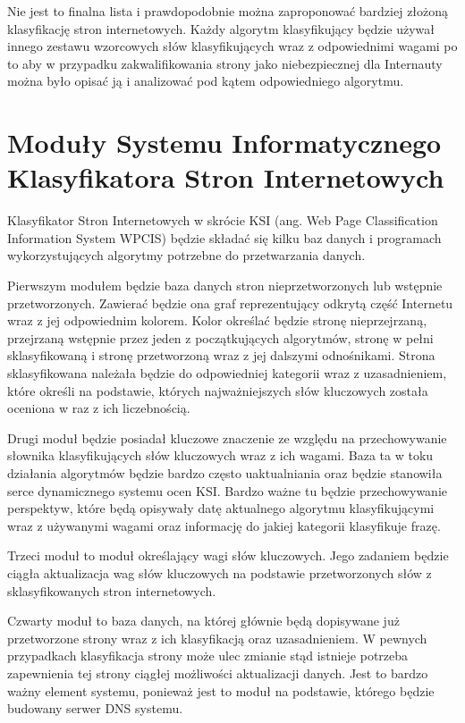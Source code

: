 \documentclass[9pt,a4paper]{extarticle}
\begin{document}
\begin{multicols}{2}
Nie jest to finalna lista i prawdopodobnie można zaproponować bardziej złożoną klasyfikację stron internetowych. Każdy algorytm klasyfikujący będzie używał innego zestawu wzorcowych słów klasyfikujących wraz z odpowiednimi wagami po to aby w przypadku zakwalifikowania strony jako niebezpiecznej dla Internauty można było opisać ją i analizować pod kątem odpowiedniego algorytmu.

\section{Moduły Systemu Informatycznego Klasyfikatora Stron Internetowych}

Klasyfikator Stron Internetowych w skrócie KSI (ang. Web Page Classification Information System WPCIS) będzie składać się kilku baz danych i programach wykorzystujących algorytmy potrzebne do przetwarzania danych.

Pierwszym modułem będzie baza danych stron nieprzetworzonych lub wstępnie przetworzonych. Zawierać będzie ona graf reprezentujący odkrytą część Internetu wraz z jej odpowiednim kolorem. Kolor określać będzie stronę nieprzejrzaną, przejrzaną wstępnie przez jeden z początkujących algorytmów, stronę w pełni sklasyfikowaną i stronę przetworzoną wraz z jej dalszymi odnośnikami. Strona sklasyfikowana należała będzie do odpowiedniej kategorii wraz z uzasadnieniem, które określi na podstawie, których najważniejszych słów kluczowych została oceniona w raz z ich liczebnością.

Drugi moduł będzie posiadał kluczowe znaczenie ze względu na przechowywanie słownika klasyfikujących słów kluczowych wraz z ich wagami. Baza ta w toku działania algorytmów będzie bardzo często uaktualniania oraz będzie stanowiła serce dynamicznego systemu ocen KSI. Bardzo ważne tu będzie przechowywanie perspektyw, które będą opisywały datę aktualnego algorytmu klasyfikującymi wraz z używanymi wagami oraz informację do jakiej kategorii klasyfikuje frazę.

Trzeci moduł to moduł określający wagi słów kluczowych. Jego zadaniem będzie ciągła aktualizacja wag słów kluczowych na podstawie przetworzonych słów z sklasyfikowanych stron internetowych.

Czwarty moduł to baza danych, na której głównie będą dopisywane już przetworzone strony wraz z ich klasyfikacją oraz uzasadnieniem. W pewnych przypadkach klasyfikacja strony może ulec zmianie stąd istnieje potrzeba zapewnienia tej strony ciągłej możliwości aktualizacji danych. Jest to bardzo ważny element systemu, ponieważ jest to moduł na podstawie, którego będzie budowany serwer DNS systemu.


\end{multicols}
\end{document}
